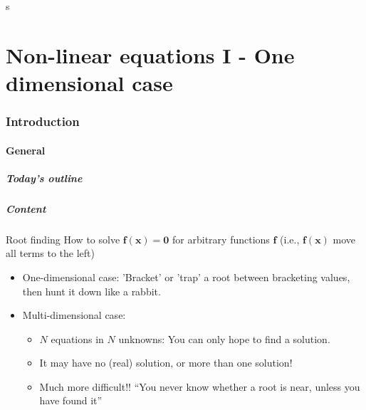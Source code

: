 s\part{Non-linear equations I - One dimensional case}
\section{Introduction}
\subsection{General}
\begin{frame}[label=contents_nonlin]
  \frametitle{Today's outline}
\end{frame}

\begin{frame}[fragile]
  \frametitle{Content}

  \begin{block}{Root finding}
    How to solve \(\mathbf{f}(\mathbf{x}) = \mathbf{0}\) for arbitrary functions \(\mathbf{f}\) (i.e., \(\mathbf{f}(\mathbf{x})\) move all terms to the left)
  \end{block}

  \begin{itemize}
    \item One-dimensional case: 'Bracket' or 'trap' a root between bracketing values, then hunt it down like a rabbit.
    \item Multi-dimensional case:
    \begin{itemize}
      \item \(N\) equations in \(N\) unknowns: You can only hope to find a solution.
      \item It may have no (real) solution, or more than one solution!
      \item Much more difficult!! “You never know whether a root is near, unless you have found it”
    \end{itemize}
  \end{itemize}
\end{frame}

